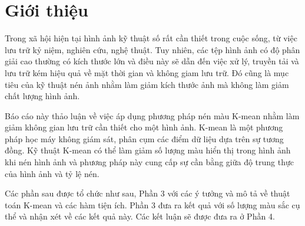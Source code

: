 \section{Giới thiệu}
Trong xã hội hiện tại hình ảnh kỹ thuật số rất cần thiết trong cuộc sống, từ việc lưu trữ kỷ niệm, nghiên cứu, nghệ thuật. Tuy nhiên, các tệp hình ảnh có độ phân giải cao thường có kích thước lớn và điều này sẽ dẫn đến việc xử lý, truyền tải và lưu trữ kém hiệu quả về mặt thời gian và không giam lưu trữ. Đó cũng là mục tiêu của kỹ thuật nén ảnh nhằm làm giảm kích thước ảnh mà không làm giảm chất lượng hình ảnh.

Báo cáo này thảo luận về việc áp dụng phương pháp nén màu K-mean nhằm làm giảm không gian lưu trữ cần thiết cho một hình ảnh. K-mean là một phương pháp học máy không giám sát, phân cụm các điểm dữ liệu dựa trên sự tương đồng. Kỹ thuật K-mean có thể làm giảm số lượng màu hiển thị trong hình ảnh khi nén hình ảnh và phương pháp này cung cấp sự cần bằng giữa độ trung thực của hình ảnh và tỷ lệ nén.

Các phần sau được tổ chức như sau, Phần 3 với các ý tưởng và mô tả về thuật toán K-mean và các hàm tiện ích. Phần 3 đưa ra kết quả với số lượng màu sắc cụ thể và nhận xét về các kết quả này. Các kết luận sẽ được đưa ra ở Phần 4.